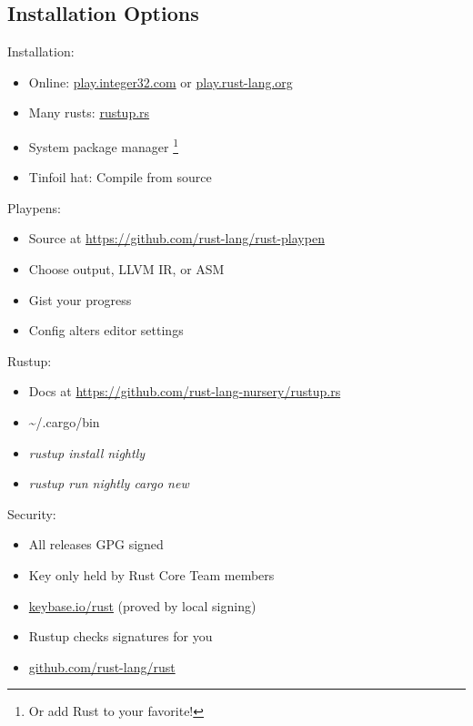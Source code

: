 \documentclass[aspectratio=169]{beamer}
\begin{document}
\subsection{Installation Options}

\begin{frame}
    Installation:
    \begin{itemize}
        \item Online: \url{play.integer32.com} or \url{play.rust-lang.org}
        \item Many rusts: \url{rustup.rs}
        \item System package manager \footnote{Or add Rust to your favorite!}
        \item Tinfoil hat: Compile from source
    \end{itemize}
\end{frame}

\begin{frame}
    Playpens:
    \begin{itemize}
        \item Source at \url{https://github.com/rust-lang/rust-playpen}
        \item Choose output, LLVM IR, or ASM
        \item Gist your progress
        \item Config alters editor settings
    \end{itemize}
\end{frame}

\begin{frame}
    Rustup:
    \begin{itemize}
        \item Docs at \url{https://github.com/rust-lang-nursery/rustup.rs}
        \item \textasciitilde /.cargo/bin
        \item \textit{rustup install nightly}
        \item \textit{rustup run nightly cargo new}
    \end{itemize}
\end{frame}

\begin{frame}
    Security:
    \begin{itemize}
        \item All releases GPG signed
        \item Key only held by Rust Core Team members
        \item \url{keybase.io/rust} (proved by local signing)
        \item Rustup checks signatures for you
        \item \url{github.com/rust-lang/rust}
    \end{itemize}
\end{frame}
\end{document}
